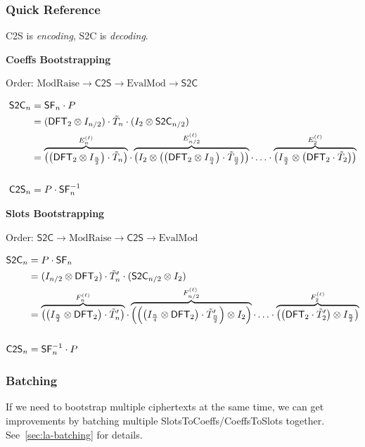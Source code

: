 \documentclass[../fheimpl.tex]{subfiles}
\begin{document}
	\subsubsection{Quick Reference}
	C2S is \emph{encoding}, S2C is \emph{decoding}.
	
	\textbf{Coeffs Bootstrapping}
	
	Order: $\mathrm{ModRaise}\rightarrow\mathsf{C2S}\rightarrow\mathrm{EvalMod}\rightarrow\mathsf{S2C}$

	\begin{align*}
		\mathsf{S2C}_n &= \mathsf{SF}_n\cdot P \\
		&= (\mathsf{DFT}_2\otimes I_{n/2})\cdot \tilde{T}_n\cdot(I_2\otimes \mathsf{S2C}_{n/2}) \\
		&= \overbrace{\parens*{\parens*{\mathsf{DFT}_2\otimes I_\frac{n}{2}}\cdot \tilde{T}_n}}^{E_n^{(\ell)}}\cdot
		\overbrace{\parens*{I_2\otimes \parens*{\parens*{\mathsf{DFT}_2\otimes I_\frac{n}{4}}\cdot \tilde{T}_\frac{n}{2}}}}^{E_{n/2}^{(\ell)}}\cdot\ldots\cdot
		\overbrace{\parens*{I_\frac{n}{2}\otimes \parens*{\mathsf{DFT}_2\cdot \tilde{T}_2}}}^{E_2^{(\ell)}} \\
		\\
		\mathsf{C2S}_n &= P\cdot \mathsf{SF}^{-1}_n
	\end{align*}
	
	\hfill \break
	
	\textbf{Slots Bootstrapping}

	Order: $\mathsf{S2C}\rightarrow\mathrm{ModRaise}\rightarrow\mathsf{C2S}\rightarrow\mathrm{EvalMod}$
	
	\begin{align*}
		\mathsf{S2C}_n &= P\cdot \mathsf{SF}_n \\
		&= (I_{n/2} \otimes \mathsf{DFT}_2)\cdot \tilde{T}'_n\cdot(\mathsf{S2C}_{n/2}\otimes I_2) \\
		&= \overbrace{\parens*{\parens*{I_\frac{n}{2}\otimes\mathsf{DFT}_2}\cdot \tilde{T}'_n}}^{F_n^{(\ell)}}\cdot
		\overbrace{\parens*{\parens*{\parens*{I_\frac{n}{4}\otimes \mathsf{DFT}_2}\cdot \tilde{T}'_\frac{n}{2}}\otimes I_2}}^{F_{n/2}^{(\ell)}}\cdot\ldots\cdot
		\overbrace{\parens*{\parens*{\mathsf{DFT}_2\cdot \tilde{T}'_2}\otimes I_\frac{n}{2}}}^{F_2^{(\ell)}} \\
		\\
		\mathsf{C2S}_n &= \mathsf{SF}^{-1}_n\cdot P
	\end{align*}

    \subsubsection{Batching}
    If we need to bootstrap multiple ciphertexts at the same time, we can get improvements by batching multiple SlotsToCoeffs/CoeffsToSlots together. See~\cref{sec:la-batching} for details.
    
\end{document}

